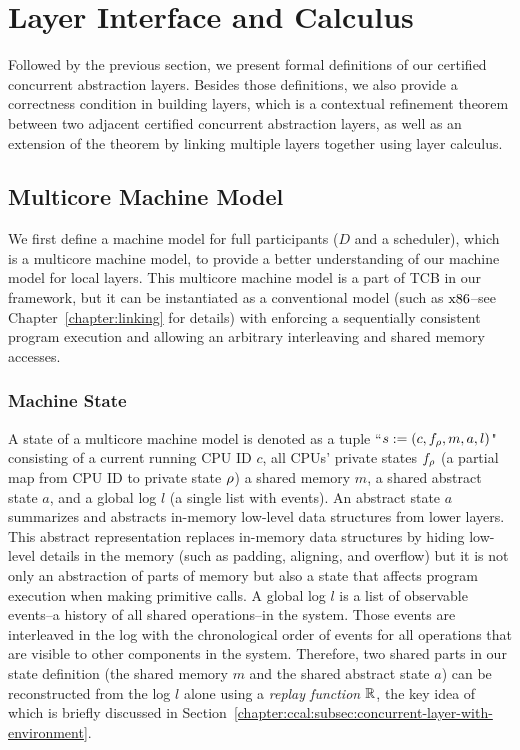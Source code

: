 \section{Layer Interface and Calculus}
\label{chapter:ccal:sec:interface-calculus}

Followed by the previous section, 
we present formal definitions of our certified concurrent abstraction layers.
Besides those definitions, 
we also provide a correctness condition in building layers, which is 
a contextual refinement theorem between two adjacent certified concurrent abstraction layers,
as well as an extension of the theorem by linking multiple layers together using layer calculus.


\subsection{Multicore Machine Model}
\label{chapter:ccal:subsec:multicore-machine-model}


We first define a machine model for full participants ($D$ and  a scheduler), which is a multicore machine model, 
to provide a better understanding of our machine model for local layers.
This multicore machine model is a part of TCB in our framework, but it can be instantiated as a conventional model (such as $\mathrm{x86}$--see Chapter~\ref{chapter:linking} for  details) with enforcing a sequentially consistent program
execution and allowing an arbitrary interleaving
and shared memory accesses. 


\subsubsection{Machine State} 
A state of a  multicore machine model is denoted as a tuple ``$s := (c, f_{\rho}, m, a, l)$"
consisting of
 a current running CPU ID $c$,
all CPUs' private states $f_\rho$ (a partial map from CPU ID to  private state $\rho$)
 a shared memory $m$,
 a shared abstract state $a$,
and a global log $l$ (a single list with events).
An abstract state $a$ 
summarizes and abstracts in-memory low-level data structures from lower layers. 
This abstract representation replaces
in-memory data structures by hiding low-level details in the memory (such as padding, aligning, and overflow)
but it is not only an abstraction of parts of memory but also a state that affects program execution when making primitive calls. 
A global log $l$ is a list of observable events--a history of all shared operations--in the system.
Those events are
interleaved in the log with the chronological order of events for all operations that are visible to other components in the system. 
Therefore, 
two shared parts in our state definition (the shared memory $m$  
and the shared abstract state $a$)
can be reconstructed
from the log $l$ alone  using a \emph{replay function} $\mathbb{R}$,
the key idea of which is briefly discussed in Section~\ref{chapter:ccal:subsec:concurrent-layer-with-environment}.


